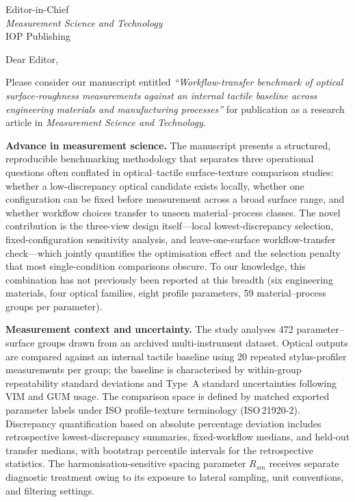 \documentclass[10pt]{letter}
\begin{document}
\begin{letter}{Editor-in-Chief\\
\textit{Measurement Science and Technology}\\
IOP Publishing}

\opening{Dear Editor,}

Please consider our manuscript entitled \emph{``Workflow-transfer benchmark of optical surface-roughness measurements against an internal tactile baseline across engineering materials and manufacturing processes''} for publication as a research article in \textit{Measurement Science and Technology}.

\textbf{Advance in measurement science.}
The manuscript presents a structured, reproducible benchmarking methodology that separates three operational questions often conflated in optical--tactile surface-texture comparison studies: whether a low-discrepancy optical candidate exists locally, whether one configuration can be fixed before measurement across a broad surface range, and whether workflow choices transfer to unseen material--process classes. The novel contribution is the three-view design itself---local lowest-discrepancy selection, fixed-configuration sensitivity analysis, and leave-one-surface workflow-transfer check---which jointly quantifies the optimisation effect and the selection penalty that most single-condition comparisons obscure. To our knowledge, this combination has not previously been reported at this breadth (six engineering materials, four optical families, eight profile parameters, 59 material--process groups per parameter).

\textbf{Measurement context and uncertainty.}
The study analyses 472 parameter--surface groups drawn from an archived multi-instrument dataset. Optical outputs are compared against an internal tactile baseline using 20 repeated stylus-profiler measurements per group; the baseline is characterised by within-group repeatability standard deviations and Type~A standard uncertainties following VIM and GUM usage. The comparison space is defined by matched exported parameter labels under ISO profile-texture terminology (ISO\,21920-2). Discrepancy quantification based on absolute percentage deviation includes retrospective lowest-discrepancy summaries, fixed-workflow medians, and held-out transfer medians, with bootstrap percentile intervals for the retrospective statistics. The harmonisation-sensitive spacing parameter $R_{sm}$ receives separate diagnostic treatment owing to its exposure to lateral sampling, unit conventions, and filtering settings.


\end{letter}
\end{document}
